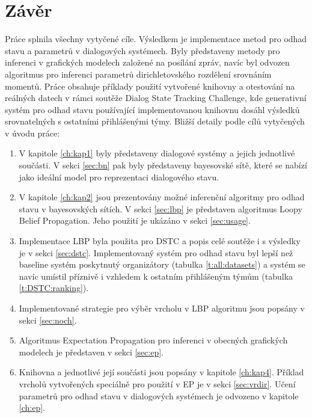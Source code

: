 \chapter*{Závěr}

Práce splnila všechny vytyčené cíle.
Výsledkem je implementace metod pro odhad stavu a parametrů v dialogových systémech.
Byly představeny metody pro inferenci v grafických modelech založené na posílání zpráv, navíc byl odvozen algoritmus pro inferenci parametrů dirichletovského rozdělení srovnáním momentů.
Práce obsahuje příklady použití vytvořené knihovny a otestování na reálných datech v rámci soutěže Dialog State Tracking Challenge, kde generativní systém pro odhad stavu používající implementovanou knihovnu dosáhl výsledků srovnatelných s ostatními přihlášenými týmy.
Bližší detaily podle cílů vytyčených v úvodu práce:
\begin{enumerate}

\item V kapitole \ref{ch:kap1} byly představeny dialogové systémy a jejich jednotlivé součásti.
V sekci \ref{sec:bn} pak byly představeny bayesovské sítě, které se nabízí jako ideální model pro reprezentaci dialogového stavu.

\item V kapitole \ref{ch:kap2} jsou prezentovány možné inferenční algoritmy pro odhad stavu v bayesovských sítích.
V sekci \ref{sec:lbp} je představen algoritmus Loopy Belief Propagation.
Jeho použití je ukázáno v sekci \ref{sec:usage}.

\item Implementace LBP byla použita pro DSTC a popis celé soutěže i s výsledky je v sekci \ref{sec:dstc}.
Implementovaný systém pro odhad stavu byl lepší než baseline systém poskytnutý organizátory (tabulka \ref{t:all:datasets}) a systém se navíc umístil příznivě i vzhledem k ostatním přihlášeným týmům (tabulka \ref{t:DSTC:ranking}).

\item Implementované strategie pro výběr vrcholu v LBP algoritmu jsou popsány v sekci \ref{sec:noch}.

\item Algoritmus Expectation Propagation pro inferenci v obecných grafických modelech je představen v sekci \ref{sec:ep}.

\item Knihovna a jednotlivé její součásti jsou popsány v kapitole \ref{ch:kap4}.
Příklad vrcholů vytvořených speciálně pro použití v EP je v sekci \ref{sec:vrdir}.
Učení parametrů pro odhad stavu v dialogových systémech je odvozeno v kapitole \ref{ch:ep}.
\end{enumerate}
